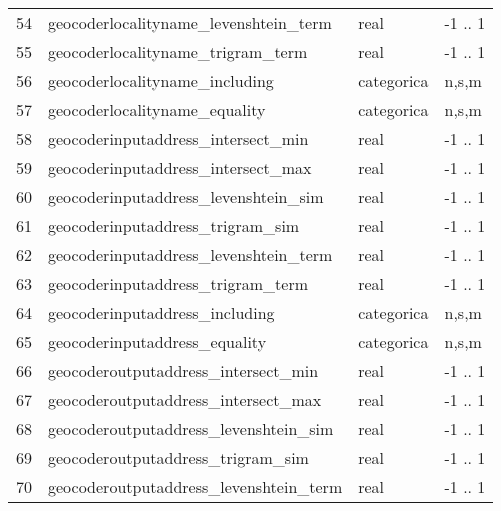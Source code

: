 \documentclass[journal]{IEEEtran}
\begin{document}
\begin{table}[ht!]
\begin{tabular}{l | l l l}
54	& geocoderlocalityname\_levenshtein\_term  &   real & -1 .. 1  \\
55	& geocoderlocalityname\_trigram\_term  &   real & -1 .. 1  \\
56	& geocoderlocalityname\_including  &    categorica &  n,s,m  \\
57	& geocoderlocalityname\_equality  &    categorica &  n,s,m  \\
58	& geocoderinputaddress\_intersect\_min  &   real & -1 .. 1  \\
59	& geocoderinputaddress\_intersect\_max  &   real & -1 .. 1  \\
60	& geocoderinputaddress\_levenshtein\_sim  &   real & -1 .. 1  \\
61	& geocoderinputaddress\_trigram\_sim  &   real & -1 .. 1  \\
62	& geocoderinputaddress\_levenshtein\_term  &   real & -1 .. 1  \\
63	& geocoderinputaddress\_trigram\_term  &   real & -1 .. 1  \\
64	& geocoderinputaddress\_including  &    categorica &  n,s,m  \\
65	& geocoderinputaddress\_equality  &    categorica &  n,s,m  \\
66	& geocoderoutputaddress\_intersect\_min  &   real & -1 .. 1  \\
67	& geocoderoutputaddress\_intersect\_max  &   real & -1 .. 1  \\
68	& geocoderoutputaddress\_levenshtein\_sim  &   real & -1 .. 1  \\
69	& geocoderoutputaddress\_trigram\_sim  &   real & -1 .. 1  \\
70	& geocoderoutputaddress\_levenshtein\_term  &   real & -1 .. 1  \\
\end{tabular}
\end{table}
\end{document}
